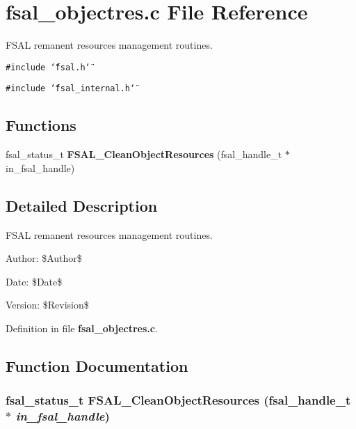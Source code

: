 \section{fsal\_\-objectres.c File Reference}
\label{fsal__objectres_8c}
FSAL remanent resources management routines.  


{\tt \#include \char`\"{}fsal.h\char`\"{}}\par
{\tt \#include \char`\"{}fsal\_\-internal.h\char`\"{}}\par
\subsection*{Functions}
\begin{CompactItemize}
\item 
fsal\_\-status\_\-t {\bf FSAL\_\-CleanObjectResources} (fsal\_\-handle\_\-t $\ast$in\_\-fsal\_\-handle)
\end{CompactItemize}


\subsection{Detailed Description}
FSAL remanent resources management routines. 

\begin{Desc}
\item[Author:]\$Author\$ \end{Desc}
\begin{Desc}
\item[Date:]\$Date\$ \end{Desc}
\begin{Desc}
\item[Version:]\$Revision\$ \end{Desc}


Definition in file {\bf fsal\_\-objectres.c}.

\subsection{Function Documentation}
\subsubsection[{FSAL\_\-CleanObjectResources}]{\setlength{\rightskip}{0pt plus 5cm}fsal\_\-status\_\-t FSAL\_\-CleanObjectResources (fsal\_\-handle\_\-t $\ast$ {\em in\_\-fsal\_\-handle})}\label{fsal__objectres_8c_9cdb7b01b46334f98ae0c03b2bb12594}


